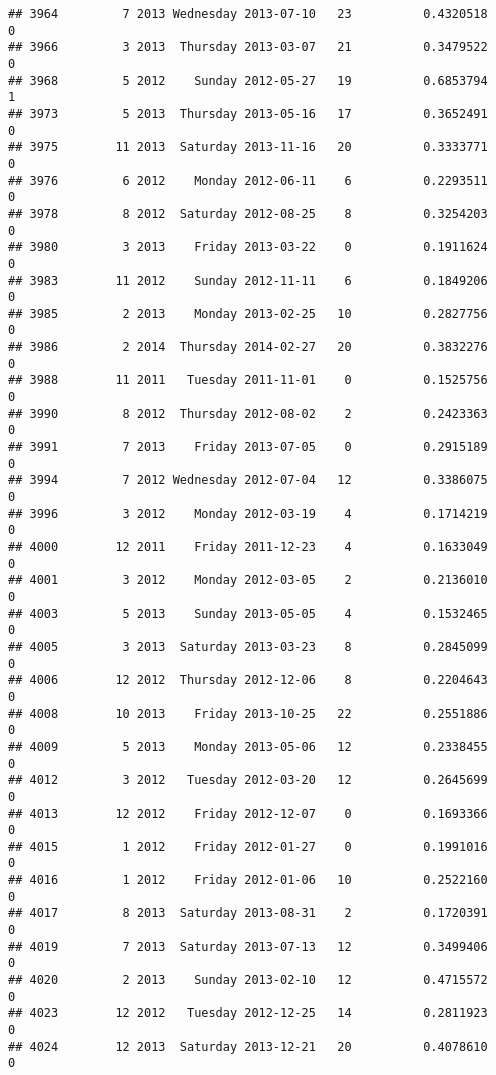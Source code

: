 \documentclass[
]{article}
\begin{document}
\begin{verbatim}
## 3964         7 2013 Wednesday 2013-07-10   23          0.4320518             0
## 3966         3 2013  Thursday 2013-03-07   21          0.3479522             0
## 3968         5 2012    Sunday 2012-05-27   19          0.6853794             1
## 3973         5 2013  Thursday 2013-05-16   17          0.3652491             0
## 3975        11 2013  Saturday 2013-11-16   20          0.3333771             0
## 3976         6 2012    Monday 2012-06-11    6          0.2293511             0
## 3978         8 2012  Saturday 2012-08-25    8          0.3254203             0
## 3980         3 2013    Friday 2013-03-22    0          0.1911624             0
## 3983        11 2012    Sunday 2012-11-11    6          0.1849206             0
## 3985         2 2013    Monday 2013-02-25   10          0.2827756             0
## 3986         2 2014  Thursday 2014-02-27   20          0.3832276             0
## 3988        11 2011   Tuesday 2011-11-01    0          0.1525756             0
## 3990         8 2012  Thursday 2012-08-02    2          0.2423363             0
## 3991         7 2013    Friday 2013-07-05    0          0.2915189             0
## 3994         7 2012 Wednesday 2012-07-04   12          0.3386075             0
## 3996         3 2012    Monday 2012-03-19    4          0.1714219             0
## 4000        12 2011    Friday 2011-12-23    4          0.1633049             0
## 4001         3 2012    Monday 2012-03-05    2          0.2136010             0
## 4003         5 2013    Sunday 2013-05-05    4          0.1532465             0
## 4005         3 2013  Saturday 2013-03-23    8          0.2845099             0
## 4006        12 2012  Thursday 2012-12-06    8          0.2204643             0
## 4008        10 2013    Friday 2013-10-25   22          0.2551886             0
## 4009         5 2013    Monday 2013-05-06   12          0.2338455             0
## 4012         3 2012   Tuesday 2012-03-20   12          0.2645699             0
## 4013        12 2012    Friday 2012-12-07    0          0.1693366             0
## 4015         1 2012    Friday 2012-01-27    0          0.1991016             0
## 4016         1 2012    Friday 2012-01-06   10          0.2522160             0
## 4017         8 2013  Saturday 2013-08-31    2          0.1720391             0
## 4019         7 2013  Saturday 2013-07-13   12          0.3499406             0
## 4020         2 2013    Sunday 2013-02-10   12          0.4715572             0
## 4023        12 2012   Tuesday 2012-12-25   14          0.2811923             0
## 4024        12 2013  Saturday 2013-12-21   20          0.4078610             0

\end{verbatim}
\end{document}
